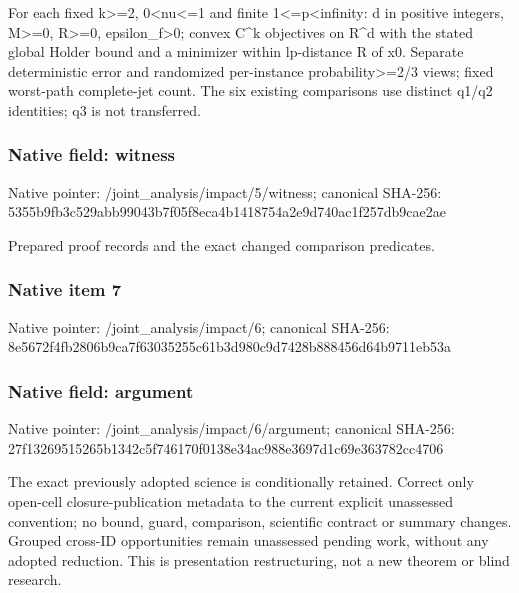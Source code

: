 \documentclass[10pt,a4paper]{article}
\begin{document}
\begingroup\raggedright\sloppy For each fixed k>=\allowbreak{}2,\allowbreak{} 0<nu<=\allowbreak{}1 and finite 1<=\allowbreak{}p<infinity:\allowbreak{} d in positive integers,\allowbreak{} M>=\allowbreak{}0,\allowbreak{} R>=\allowbreak{}0,\allowbreak{} epsilon\_\allowbreak{}f>0;\allowbreak{} convex C\textasciicircum{}k objectives on R\textasciicircum{}d with the stated global Holder bound and a minimizer within lp-distance R of x0. Separate deterministic error and randomized per-instance probability>=\allowbreak{}2/\allowbreak{}3 views;\allowbreak{} fixed worst-path complete-jet count. The six existing comparisons use distinct q1/\allowbreak{}q2 identities;\allowbreak{} q3 is not transferred.\par\endgroup

\subsubsection{Native field: witness}
Native pointer: /joint\_\allowbreak{}analysis/impact/5/witness; canonical SHA-256: 5355b9fb3c529abb99043b7f05f8eca4b1418754a2e9d740ac1f257db9cae2ae

\begingroup\raggedright\sloppy Prepared proof records and the exact changed comparison predicates.\par\endgroup

\subsubsection{Native item 7}
Native pointer: /joint\_\allowbreak{}analysis/impact/6; canonical SHA-256: 8e5672f4fb2806b9ca7f63035255c61b3d980c9d7428b888456d64b9711eb53a

\subsubsection{Native field: argument}
Native pointer: /joint\_\allowbreak{}analysis/impact/6/argument; canonical SHA-256: 27f13269515265b1342c5f746170f0138e34ac988e3697d1c69e363782cc4706

\begingroup\raggedright\sloppy The exact previously adopted science is conditionally retained. Correct only open-cell closure-publication metadata to the current explicit unassessed convention;\allowbreak{} no bound,\allowbreak{} guard,\allowbreak{} comparison,\allowbreak{} scientific contract or summary changes. Grouped cross-ID opportunities remain unassessed pending work,\allowbreak{} without any adopted reduction. This is presentation restructuring,\allowbreak{} not a new theorem or blind research.\par\endgroup
\end{document}
